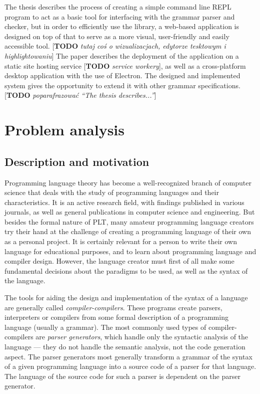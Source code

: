 \documentclass[english,engineering]{wizthesis}
\newcommand{\todo}[1]{{\color{red}[\textbf{TODO} \textit{#1}]}}
\begin{document}
The thesis describes the process of creating a simple command line REPL program
to act as a basic tool for interfacing with the grammar parser and checker, but
in order to efficiently use the library, a web-based application is designed on
top of that to serve as a more visual, user-friendly and easily accessible tool.
\todo{tutaj coś o wizualizacjach, edytorze tesktowym i highlightowaniu} The
paper describes the deployment of the application on a static site hosting
service \todo{service workery}, as well as a cross-platform desktop application
with the use of Electron. The designed and implemented system gives the
opportunity to extend it with other grammar specifications.
\todo{poparafrazować ``The thesis describes...''}

\tableofcontents

\mainmatter %

\chapter{Problem analysis}

\section{Description and motivation}

Programming language theory has become a well-recognized branch of computer
science that deals with the study of programming languages and their
characteristics. It is an active research field, with findings published in
various journals, as well as general publications in computer science and
engineering. But besides the formal nature of PLT, many amateur programming
language creators try their hand at the challenge of creating a programming
language of their own as a personal project. It is certainly relevant for a
person to write their own language for educational purposes, and to learn about
programming language and compiler design. However, the language creator must
first of all make some fundamental decisions about the paradigms to be used, as
well as the syntax of the language.

The tools for aiding the design and implementation of the syntax of a language
are generally called \textit{compiler-compilers}. These programs create parsers,
interpreters or compilers from some formal description of a programming
language (usually a grammar). The most commonly used types of
compiler-compilers are \textit{parser generators}, which handle only the
syntactic analysis of the language --- they do not handle the semantic analysis,
not the code generation aspect. The parser generators most generally transform a
grammar of the syntax of a given programming language into a source code of a
parser for that language. The language of the source code for such a parser is
dependent on the parser generator.
\end{document}
